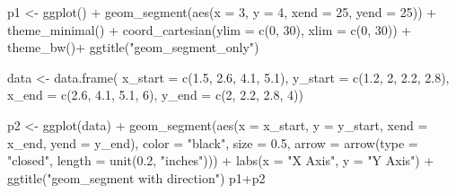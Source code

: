 \documentclass[
  letterpaper,
  DIV=11,
  numbers=noendperiod]{scrreprt}
\newenvironment{Shaded}{\begin{snugshade}}{\end{snugshade}}
\newcommand{\AttributeTok}[1]{\textcolor[rgb]{0.40,0.45,0.13}{#1}}
\newcommand{\DecValTok}[1]{\textcolor[rgb]{0.68,0.00,0.00}{#1}}
\newcommand{\FloatTok}[1]{\textcolor[rgb]{0.68,0.00,0.00}{#1}}
\newcommand{\FunctionTok}[1]{\textcolor[rgb]{0.28,0.35,0.67}{#1}}
\newcommand{\NormalTok}[1]{\textcolor[rgb]{0.00,0.23,0.31}{#1}}
\newcommand{\OtherTok}[1]{\textcolor[rgb]{0.00,0.23,0.31}{#1}}
\newcommand{\SpecialCharTok}[1]{\textcolor[rgb]{0.37,0.37,0.37}{#1}}
\newcommand{\StringTok}[1]{\textcolor[rgb]{0.13,0.47,0.30}{#1}}
\begin{document}
\begin{Shaded}
\begin{Highlighting}[]
\NormalTok{p1 }\OtherTok{\textless{}{-}} \FunctionTok{ggplot}\NormalTok{() }\SpecialCharTok{+} 
  \FunctionTok{geom\_segment}\NormalTok{(}\FunctionTok{aes}\NormalTok{(}\AttributeTok{x =} \DecValTok{3}\NormalTok{, }\AttributeTok{y =} \DecValTok{4}\NormalTok{, }\AttributeTok{xend =} \DecValTok{25}\NormalTok{, }\AttributeTok{yend =} \DecValTok{25}\NormalTok{)) }\SpecialCharTok{+}
  \FunctionTok{theme\_minimal}\NormalTok{() }\SpecialCharTok{+}
  \FunctionTok{coord\_cartesian}\NormalTok{(}\AttributeTok{ylim =} \FunctionTok{c}\NormalTok{(}\DecValTok{0}\NormalTok{, }\DecValTok{30}\NormalTok{), }\AttributeTok{xlim =} \FunctionTok{c}\NormalTok{(}\DecValTok{0}\NormalTok{, }\DecValTok{30}\NormalTok{)) }\SpecialCharTok{+}
  \FunctionTok{theme\_bw}\NormalTok{()}\SpecialCharTok{+}
  \FunctionTok{ggtitle}\NormalTok{(}\StringTok{"geom\_segment\_only"}\NormalTok{)}


\NormalTok{data }\OtherTok{\textless{}{-}} \FunctionTok{data.frame}\NormalTok{(}
  \AttributeTok{x\_start =} \FunctionTok{c}\NormalTok{(}\FloatTok{1.5}\NormalTok{, }\FloatTok{2.6}\NormalTok{, }\FloatTok{4.1}\NormalTok{, }\FloatTok{5.1}\NormalTok{),}
  \AttributeTok{y\_start =} \FunctionTok{c}\NormalTok{(}\FloatTok{1.2}\NormalTok{, }\DecValTok{2}\NormalTok{, }\FloatTok{2.2}\NormalTok{, }\FloatTok{2.8}\NormalTok{),}
  \AttributeTok{x\_end =} \FunctionTok{c}\NormalTok{(}\FloatTok{2.6}\NormalTok{, }\FloatTok{4.1}\NormalTok{, }\FloatTok{5.1}\NormalTok{, }\DecValTok{6}\NormalTok{),}
  \AttributeTok{y\_end =} \FunctionTok{c}\NormalTok{(}\DecValTok{2}\NormalTok{, }\FloatTok{2.2}\NormalTok{, }\FloatTok{2.8}\NormalTok{, }\DecValTok{4}\NormalTok{))}

\NormalTok{p2 }\OtherTok{\textless{}{-}} \FunctionTok{ggplot}\NormalTok{(data) }\SpecialCharTok{+}
  \FunctionTok{geom\_segment}\NormalTok{(}\FunctionTok{aes}\NormalTok{(}\AttributeTok{x =}\NormalTok{ x\_start, }\AttributeTok{y =}\NormalTok{ y\_start, }\AttributeTok{xend =}\NormalTok{ x\_end, }\AttributeTok{yend =}\NormalTok{ y\_end),}
               \AttributeTok{color =} \StringTok{"black"}\NormalTok{, }\AttributeTok{size =} \FloatTok{0.5}\NormalTok{, }
               \AttributeTok{arrow =} \FunctionTok{arrow}\NormalTok{(}\AttributeTok{type =} \StringTok{"closed"}\NormalTok{, }\AttributeTok{length =} \FunctionTok{unit}\NormalTok{(}\FloatTok{0.2}\NormalTok{, }\StringTok{"inches"}\NormalTok{))) }\SpecialCharTok{+}
  \FunctionTok{labs}\NormalTok{(}\AttributeTok{x =} \StringTok{"X Axis"}\NormalTok{,}
       \AttributeTok{y =} \StringTok{"Y Axis"}\NormalTok{) }\SpecialCharTok{+}
  \FunctionTok{ggtitle}\NormalTok{(}\StringTok{"geom\_segment with direction"}\NormalTok{)}
\NormalTok{p1}\SpecialCharTok{+}\NormalTok{p2}
\end{Highlighting}
\end{Shaded}
\end{document}
